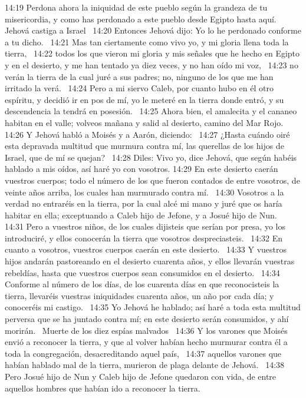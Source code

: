 14:19 Perdona ahora la iniquidad de este pueblo según la grandeza de tu misericordia, y como has perdonado a este pueblo desde Egipto hasta aquí. 
Jehová castiga a Israel   
14:20 Entonces Jehová dijo: Yo lo he perdonado conforme a tu dicho.  
14:21 Mas tan ciertamente como vivo yo, y mi gloria llena toda la tierra,  
14:22 todos los que vieron mi gloria y mis señales que he hecho en Egipto y en el desierto, y me han tentado ya diez veces, y no han oído mi voz,  
14:23 no verán la tierra de la cual juré a sus padres; no, ninguno de los que me han irritado la verá.  
14:24 Pero a mi siervo Caleb, por cuanto hubo en él otro espíritu, y decidió ir en pos de mí, yo le meteré en la tierra donde entró, y su descendencia la tendrá en posesión.  
14:25 Ahora bien, el amalecita y el cananeo habitan en el valle; volveos mañana y salid al desierto, camino del Mar Rojo.  
14:26 Y Jehová habló a Moisés y a Aarón, diciendo:  
14:27 ¿Hasta cuándo oiré esta depravada multitud que murmura contra mí, las querellas de los hijos de Israel, que de mí se quejan?  
14:28 Diles: Vivo yo, dice Jehová, que según habéis hablado a mis oídos, así haré yo con vosotros. 
14:29 En este desierto caerán vuestros cuerpos; todo el número de los que fueron contados de entre vosotros, de veinte años arriba, los cuales han murmurado contra mí.  
14:30 Vosotros a la verdad no entraréis en la tierra, por la cual alcé mi mano y juré que os haría habitar en ella; exceptuando a Caleb hijo de Jefone, y a Josué hijo de Nun.  
14:31 Pero a vuestros niños, de los cuales dijisteis que serían por presa, yo los introduciré, y ellos conocerán la tierra que vosotros despreciasteis.  
14:32 En cuanto a vosotros, vuestros cuerpos caerán en este desierto.  
14:33 Y vuestros hijos andarán pastoreando en el desierto cuarenta años, y ellos llevarán vuestras rebeldías, hasta que vuestros cuerpos sean consumidos en el desierto.  
14:34 Conforme al número de los días, de los cuarenta días en que reconocisteis la tierra, llevaréis vuestras iniquidades cuarenta años, un año por cada día; y conoceréis mi castigo.  
14:35 Yo Jehová he hablado; así haré a toda esta multitud perversa que se ha juntado contra mí; en este desierto serán consumidos, y ahí morirán.  
Muerte de los diez espías malvados  
14:36 Y los varones que Moisés envió a reconocer la tierra, y que al volver habían hecho murmurar contra él a toda la congregación, desacreditando aquel país,  
14:37 aquellos varones que habían hablado mal de la tierra, murieron de plaga delante de Jehová.  
14:38 Pero Josué hijo de Nun y Caleb hijo de Jefone quedaron con vida, de entre aquellos hombres que habían ido a reconocer la tierra.  
